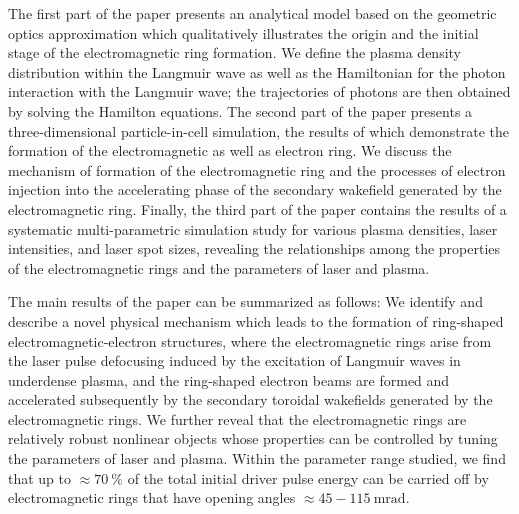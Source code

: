 \documentclass[10pt, a4paper, twoside, openright]{report}
\begin{document}
The first part of the paper presents an analytical model based on the geometric optics approximation which qualitatively illustrates the origin and the initial stage of the electromagnetic ring formation. We define the plasma density distribution within the Langmuir wave as well as the Hamiltonian for the photon interaction with the Langmuir wave; the trajectories of photons are then obtained by solving the Hamilton equations. The second part of the paper presents a three-dimensional particle-in-cell simulation, the results of which demonstrate the formation of the electromagnetic as well as electron ring. We discuss the mechanism of formation of the electromagnetic ring and the processes of electron injection into the accelerating phase of the secondary wakefield generated by the electromagnetic ring. Finally, the third part of the paper contains the results of a systematic multi-parametric simulation study for various plasma densities, laser intensities, and laser spot sizes, revealing the relationships among the properties of the electromagnetic rings and the parameters of laser and plasma.

The main results of the paper can be summarized as follows: We identify and describe a novel physical mechanism which leads to the formation of ring-shaped electromagnetic-electron structures, where the electromagnetic rings arise from the laser pulse defocusing induced by the excitation of Langmuir waves in underdense plasma, and the ring-shaped electron beams are formed and accelerated subsequently by the secondary toroidal wakefields generated by the electromagnetic rings. We further reveal that the electromagnetic rings are relatively robust nonlinear objects whose properties can be controlled by tuning the parameters of laser and plasma. Within the parameter range studied, we find that up to $ \approx 70 \ \% $ of the total initial driver pulse energy can be carried off by electromagnetic rings that have opening angles $ \approx 45 - 115 \ \mathrm{mrad} $. 
\end{document}
